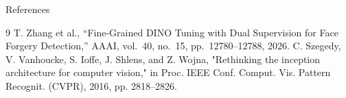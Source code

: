 \documentclass[aspectratio=169,10pt]{beamer}
\begin{document}
\begin{frame}{References}
\footnotesize
\begin{thebibliography}{9}
 T. Zhang et al., ``Fine-Grained DINO Tuning with Dual Supervision for Face Forgery Detection,'' AAAI, vol.~40, no.~15, pp.~12780--12788, 2026.
 C. Szegedy, V. Vanhoucke, S. Ioffe, J. Shlens, and Z. Wojna, "Rethinking the inception architecture for computer vision," in Proc. IEEE Conf. Comput. Vis. Pattern Recognit. (CVPR), 2016, pp. 2818–2826.
\end{thebibliography}
\end{frame}
\end{document}
